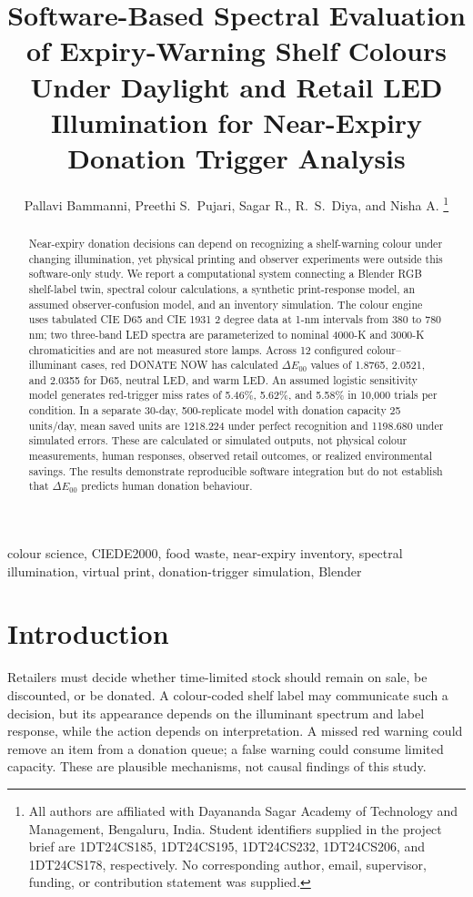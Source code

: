 \documentclass[journal]{IEEEtran}
\title{Software-Based Spectral Evaluation of Expiry-Warning Shelf Colours Under Daylight and Retail LED Illumination for Near-Expiry Donation Trigger Analysis}
\author{Pallavi Bammanni, Preethi S.~Pujari, Sagar R., R.~S.~Diya, and Nisha A.%
\thanks{All authors are affiliated with Dayananda Sagar Academy of Technology and Management, Bengaluru, India. Student identifiers supplied in the project brief are 1DT24CS185, 1DT24CS195, 1DT24CS232, 1DT24CS206, and 1DT24CS178, respectively. No corresponding author, email, supervisor, funding, or contribution statement was supplied.}}
\newcommand{\dE}{\ensuremath{\Delta E_{00}}}
\begin{document}
\maketitle
\begin{abstract}
Near-expiry donation decisions can depend on recognizing a shelf-warning colour under changing illumination, yet physical printing and observer experiments were outside this software-only study. We report a computational system connecting a Blender RGB shelf-label twin, spectral colour calculations, a synthetic print-response model, an assumed observer-confusion model, and an inventory simulation. The colour engine uses tabulated CIE D65 and CIE 1931 2 degree data at 1-nm intervals from 380 to 780 nm; two three-band LED spectra are parameterized to nominal 4000-K and 3000-K chromaticities and are not measured store lamps. Across 12 configured colour--illuminant cases, red DONATE NOW has calculated \dE{} values of 1.8765, 2.0521, and 2.0355 for D65, neutral LED, and warm LED. An assumed logistic sensitivity model generates red-trigger miss rates of 5.46\%, 5.62\%, and 5.58\% in 10,000 trials per condition. In a separate 30-day, 500-replicate model with donation capacity 25 units/day, mean saved units are 1218.224 under perfect recognition and 1198.680 under simulated errors. These are calculated or simulated outputs, not physical colour measurements, human responses, observed retail outcomes, or realized environmental savings. The results demonstrate reproducible software integration but do not establish that \dE{} predicts human donation behaviour.
\end{abstract}
\begin{IEEEkeywords}
colour science, CIEDE2000, food waste, near-expiry inventory, spectral illumination, virtual print, donation-trigger simulation, Blender
\end{IEEEkeywords}

\section{Introduction}
Retailers must decide whether time-limited stock should remain on sale, be discounted, or be donated. A colour-coded shelf label may communicate such a decision, but its appearance depends on the illuminant spectrum and label response, while the action depends on interpretation. A missed red warning could remove an item from a donation queue; a false warning could consume limited capacity. These are plausible mechanisms, not causal findings of this study.
\end{document}
